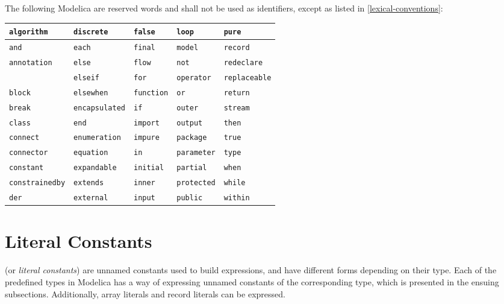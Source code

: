 The following Modelica  are reserved words and shall not be used as identifiers, except as listed in \cref{lexical-conventions}:
\begin{center}
\begin{tabular}{l l l l l}
\lstinline!algorithm! & \lstinline!discrete! & \lstinline!false! & \lstinline!loop! & \lstinline!pure!\\ \hline
\lstinline!and! & \lstinline!each! & \lstinline!final! & \lstinline!model! & \lstinline!record!\\ \hline
\lstinline!annotation! & \lstinline!else! & \lstinline!flow! & \lstinline!not! & \lstinline!redeclare!\\ \hline
& \lstinline!elseif! & \lstinline!for! & \lstinline!operator! & \lstinline!replaceable!\\ \hline
\lstinline!block! & \lstinline!elsewhen! & \lstinline!function! & \lstinline!or! & \lstinline!return!\\ \hline
\lstinline!break! & \lstinline!encapsulated! & \lstinline!if! & \lstinline!outer! & \lstinline!stream!\\ \hline
\lstinline!class! & \lstinline!end! & \lstinline!import! & \lstinline!output! & \lstinline!then!\\ \hline
\lstinline!connect! & \lstinline!enumeration! & \lstinline!impure! & \lstinline!package! & \lstinline!true!\\ \hline
\lstinline!connector! & \lstinline!equation! & \lstinline!in! & \lstinline!parameter! & \lstinline!type!\\ \hline
\lstinline!constant! & \lstinline!expandable! & \lstinline!initial! & \lstinline!partial! & \lstinline!when!\\ \hline
\lstinline!constrainedby! & \lstinline!extends! & \lstinline!inner! & \lstinline!protected! & \lstinline!while!\\ \hline
\lstinline!der! & \lstinline!external! & \lstinline!input! & \lstinline!public! & \lstinline!within!\\
\end{tabular}
\end{center}

\section{Literal Constants}\label{literal-constants}

 (or \emph{literal constants}) are unnamed constants used to build expressions, and have different forms depending on their type.
Each of the predefined types in Modelica has a way of expressing unnamed constants of the corresponding type, which is presented in the ensuing subsections.
Additionally, array literals and record literals can be expressed.

